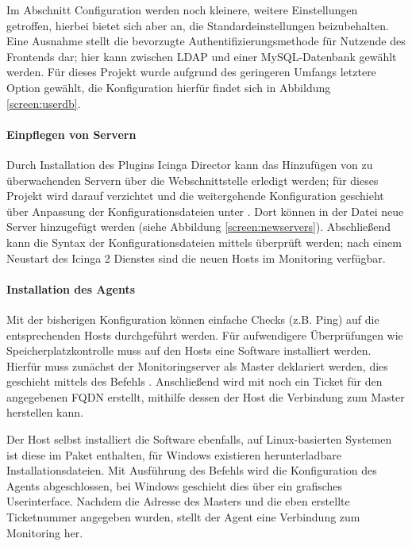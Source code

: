 Im Abschnitt \glqq{}Configuration\grqq{} werden noch kleinere, weitere Einstellungen getroffen, hierbei bietet sich aber an, die Standardeinstellungen beizubehalten. Eine Ausnahme stellt die bevorzugte Authentifizierungsmethode für Nutzende des Frontends dar; hier kann zwischen LDAP und einer MySQL-Datenbank gewählt werden. Für dieses Projekt wurde aufgrund des geringeren Umfangs letztere Option gewählt, die Konfiguration hierfür findet sich in Abbildung \ref{screen:userdb}.

\paragraph{Einpflegen von Servern}
Durch Installation des Plugins \glqq{}Icinga Director\grqq{} kann das Hinzufügen von zu überwachenden Servern über die Webschnittstelle erledigt werden; für dieses Projekt wird darauf verzichtet und die weitergehende Konfiguration geschieht über Anpassung der Konfigurationsdateien unter . Dort können in der Datei  neue Server hinzugefügt werden (siehe Abbildung \ref{screen:newservers}). Abschließend kann die Syntax der Konfigurationsdateien mittels  überprüft werden; nach einem Neustart des \glqq{}Icinga 2\grqq{} Dienstes sind die neuen Hosts im Monitoring verfügbar.

\paragraph{Installation des Agents}
Mit der bisherigen Konfiguration können einfache Checks (z.B. Ping) auf die entsprechenden Hosts durchgeführt werden. Für aufwendigere Überprüfungen wie Speicherplatzkontrolle muss auf den Hosts eine Software installiert werden. Hierfür muss zunächst der Monitoringserver als \glqq{}Master\grqq{} deklariert werden, dies geschieht mittels des Befehls . Anschließend wird mit  noch ein \glqq{}Ticket\grqq{} für den angegebenen FQDN erstellt, mithilfe dessen der Host die Verbindung zum Master herstellen kann.

Der Host selbst installiert die Software ebenfalls, auf Linux-basierten Systemen ist diese im Paket  enthalten, für Windows existieren herunterladbare Installationsdateien. Mit Ausführung des Befehls  wird die Konfiguration des Agents abgeschlossen, bei Windows geschieht dies über ein grafisches Userinterface. Nachdem die Adresse des Masters und die eben erstellte Ticketnummer angegeben wurden, stellt der Agent eine Verbindung zum Monitoring her.

